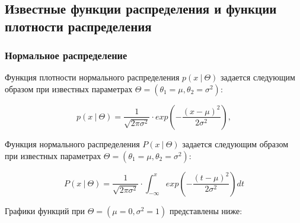 \documentclass[
  14,
]{article}
\begin{document}
\hypertarget{ux438ux437ux432ux435ux441ux442ux43dux44bux435-ux444ux443ux43dux43aux446ux438ux438-ux440ux430ux441ux43fux440ux435ux434ux435ux43bux435ux43dux438ux44f-ux438-ux444ux443ux43dux43aux446ux438ux438-ux43fux43bux43eux442ux43dux43eux441ux442ux438-ux440ux430ux441ux43fux440ux435ux434ux435ux43bux435ux43dux438ux44f}{%
\subsection{\texorpdfstring{\textbf{Известные функции распределения и
функции плотности
распределения}}{Известные функции распределения и функции плотности распределения}}\label{ux438ux437ux432ux435ux441ux442ux43dux44bux435-ux444ux443ux43dux43aux446ux438ux438-ux440ux430ux441ux43fux440ux435ux434ux435ux43bux435ux43dux438ux44f-ux438-ux444ux443ux43dux43aux446ux438ux438-ux43fux43bux43eux442ux43dux43eux441ux442ux438-ux440ux430ux441ux43fux440ux435ux434ux435ux43bux435ux43dux438ux44f}}

\hypertarget{ux43dux43eux440ux43cux430ux43bux44cux43dux43eux435-ux440ux430ux441ux43fux440ux435ux434ux435ux43bux435ux43dux438ux435}{%
\subsubsection{\texorpdfstring{\textbf{Нормальное
распределение}}{Нормальное распределение}}\label{ux43dux43eux440ux43cux430ux43bux44cux43dux43eux435-ux440ux430ux441ux43fux440ux435ux434ux435ux43bux435ux43dux438ux435}}

Функция плотности нормального распределения \(p(x\ | \ \Theta)\)
задается следующим образом при известных параметрах
\(\Theta = (\theta_1 = \mu, \theta_2 = \sigma^2)\):

\[
p(x \ | \ \Theta) = \frac{1}{\sqrt{2 \pi \sigma^2}} \cdot exp\left({-\frac{(x - \mu)^2}{2 \sigma^2}}\right) ,
\]

Функция нормального распределения \(P(x\ |\ \Theta)\) задается следующим
образом при известных параметрах
\(\Theta = (\theta_1 = \mu, \theta_2 = \sigma^2)\):

\[
P(x \ | \ \Theta) = \frac{1}{\sqrt{2 \pi \sigma^2}} \cdot \int_{-\infty}^{x} exp\left({-\frac{(t - \mu)^2}{2 \sigma^2}}\right) dt
\]

Графики функций при \(\Theta = (\mu = 0, \sigma^2 = 1)\) представлены
ниже:

\[
\ 
\]
\end{document}

